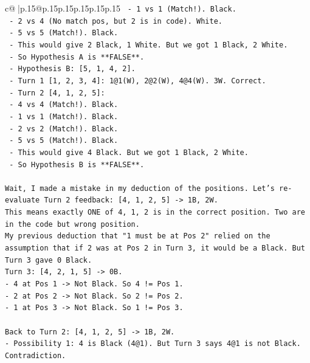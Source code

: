 \documentclass{article}
\begin{document}
{\begin{supertabular}{c@{$\;$}|p{.15\linewidth}@{}p{.15\linewidth}p{.15\linewidth}p{.15\linewidth}p{.15\linewidth}p{.15\linewidth}}
{{{\texttt{          {-} 1 vs 1 (Match!). Black.} \\
\texttt{          {-} 2 vs 4 (No match pos, but 2 is in code). White.} \\
\texttt{          {-} 5 vs 5 (Match!). Black.} \\
\texttt{        {-} This would give 2 Black, 1 White. But we got 1 Black, 2 White.} \\
\texttt{        {-} So Hypothesis A is **FALSE**.} \\
\texttt{    {-} Hypothesis B: {[}5, 1, 4, 2{]}.} \\
\texttt{      {-} Turn 1 {[}1, 2, 3, 4{]}: 1@1(W), 2@2(W), 4@4(W). 3W. Correct.} \\
\texttt{      {-} Turn 2 {[}4, 1, 2, 5{]}:} \\
\texttt{        {-} 4 vs 4 (Match!). Black.} \\
\texttt{        {-} 1 vs 1 (Match!). Black.} \\
\texttt{        {-} 2 vs 2 (Match!). Black.} \\
\texttt{        {-} 5 vs 5 (Match!). Black.} \\
\texttt{        {-} This would give 4 Black. But we got 1 Black, 2 White.} \\
\texttt{        {-} So Hypothesis B is **FALSE**.} \\
\\ 
\texttt{Wait, I made a mistake in my deduction of the positions. Let's re{-}evaluate Turn 2 feedback: {[}4, 1, 2, 5{]} {-}> 1B, 2W.} \\
\texttt{This means exactly ONE of 4, 1, 2 is in the correct position. Two are in the code but wrong position.} \\
\texttt{My previous deduction that "1 must be at Pos 2" relied on the assumption that if 2 was at Pos 2 in Turn 3, it would be a Black. But Turn 3 gave 0 Black.} \\
\texttt{Turn 3: {[}4, 2, 1, 5{]} {-}> 0B.} \\
\texttt{{-} 4 at Pos 1 {-}> Not Black. So 4 != Pos 1.} \\
\texttt{{-} 2 at Pos 2 {-}> Not Black. So 2 != Pos 2.} \\
\texttt{{-} 1 at Pos 3 {-}> Not Black. So 1 != Pos 3.} \\
\\ 
\texttt{Back to Turn 2: {[}4, 1, 2, 5{]} {-}> 1B, 2W.} \\
\texttt{{-} Possibility 1: 4 is Black (4@1). But Turn 3 says 4@1 is not Black. Contradiction.} \\
}}}
\end{supertabular}}
\end{document}
